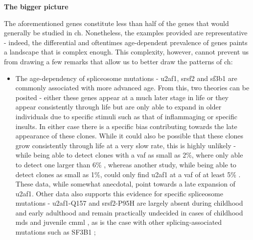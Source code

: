 \noindent \textbf{The bigger picture}

The aforementioned genes constitute less than half of the genes that would generally be studied in \ac{ch}. Nonetheless, the examples provided are representative - indeed, the differential and oftentimes age-dependent prevalence of genes paints a landscape that is complex enough. This complexity, however, cannot prevent us from drawing a few remarks that allow us to better draw the patterns of \ac{ch}:

\begin{itemize}
    \item The age-dependency of spliceosome mutations - \ac{u2af1}, \ac{srsf2} and \ac{sf3b1} are commonly associated with more advanced age. From this, two theories can be posited - either these genes appear at a much later stage in life or they appear consistently through life but are only able to expand in older individuals due to specific stimuli such as that of inflammaging \cite{Franceschi2018-be} or specific insults. In either case there is a specific bias contributing towards the late appearance of these clones. While it could also be possible that these clones grow consistently through life at a very slow rate, this is highly unlikely - while being able to detect clones with a \ac{vaf} as small as 2\%,  where only able to detect one larger than 6\%  \cite{Jaiswal2014-rl}, whereas another study, while being able to detect clones as small as 1\%, could only find \ac{u2af1} at a \ac{vaf} of at least 5\% \cite{Zehir2017-gh}. These data, while somewhat anecdotal, point towards a late expansion of \ac{u2af1}. Other data also supports this evidence for specific spliceosome mutations - \ac{u2af1}-Q157 and \ac{srsf2}-P95H are largely absent during childhood and early adulthood and remain practically undecided in cases of childhood \ac{mds} and juvenile \ac{cmml} \cite{Kar2013-nw,Hirabayashi2012-jj}, as is the case with other splicing-associated mutations such as SF3B1 \cite{Lin2014-qr};

\end{itemize}
